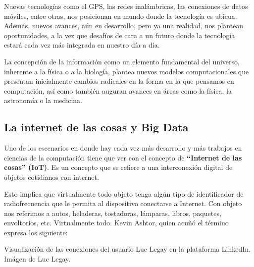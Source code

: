 Nuevas tecnologías como el GPS, las redes inalámbricas, las conexiones de datos
móviles, entre otras, nos posicionan en mundo donde la tecnología es ubicua.
Además, nuevos avances, aún en desarrollo, pero ya una realidad, nos plantean
oportunidades, a la vez que desafíos de cara a un futuro donde la tecnología
estará cada vez más integrada en nuestro día a día.

La concepción de la información como un elemento fundamental del universo,
inherente a la física o a la biología, plantea nuevos modelos computacionales
que presentan inicialmente cambios radicales en la forma en la que pensamos en
computación, así como también auguran avances en áreas como la física, la
astronomía o la medicina.

\subsection{La internet de las cosas y Big Data}
\label{chap:historia_computadoras:subsec:iot}

Uno de los escenarios en donde hay cada vez más desarrollo y más trabajos en
ciencias de la computación tiene que ver con el concepto de \textbf{``Internet
de las cosas'' (IoT)}. Es un concepto que se refiere a una interconexión digital
de objetos cotidianos con internet.\autocite{iot_2008}

Esto implica que virtualmente todo objeto tenga algún tipo de identificador de
radiofrecuencia que le permita al dispositivo conectarse a Internet. Con objeto
nos referimos a autos, heladeras, tostadoras, lámparas, libros, paquetes,
envoltorios, etc. Virtualmente todo. Kevin Ashtor, quien acuñó el término
expresa los siguiente:

{Visualización de las conexiones del usuario Luc Legay en la plataforma
LinkedIn.} {Imágen de Luc Legay.}

